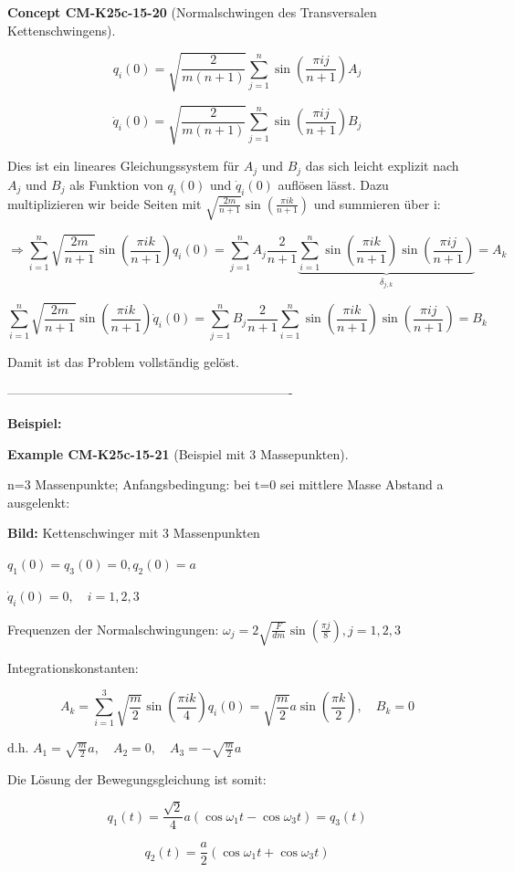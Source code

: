 \documentclass[10pt, letterpaper]{article}
\newcommand{\CustomHeading}[3]{%
  \par\medskip\noindent%
  \textbf{#1 #2} \textnormal{(#3)}.\enskip%
}
\newenvironment{EXA}[2]{\begin{unitbox}\CustomHeading{Example}{#1}{#2}}{\end{unitbox}}
\newenvironment{CONC}[2]{\begin{unitbox}\CustomHeading{Concept}{#1}{#2}}{\end{unitbox}}
\begin{document}
\begin{CONC}{CM-K25c-15-20}{Normalschwingen des Transversalen Kettenschwingens}
\[
q_i(0) = \sqrt{\frac{2}{m(n+1)}}\sum_{j=1}^n\sin\left(\frac{\pi ij}{n+1}\right)A_j
\]

\[
\dot{q}_i(0) = \sqrt{\frac{2}{m(n+1)}}\sum_{j=1}^n\sin\left(\frac{\pi ij}{n+1}\right)B_j
\]

Dies ist ein lineares Gleichungssystem für $A_j$ und $B_j$ das sich leicht explizit nach $A_j$ und $B_j$ als Funktion von
$q_i(0)$ und $\dot{q}_i(0)$ auflösen lässt. Dazu multiplizieren wir beide Seiten mit $\sqrt{\frac{2m}{n+1}}\sin\left(\frac{\pi ik}{n+1}\right)$ und summieren über i:

\[\Rightarrow \sum_{i=1}^n \sqrt{\frac{2m}{n+1}}\sin\left(\frac{\pi ik}{n+1}\right)q_i(0) = \sum_{j=1}^n A_j \frac{2}{n+1} \underbrace{\sum_{i=1}^n \sin\left(\frac{\pi ik}{n+1}\right)\sin\left(\frac{\pi ij}{n+1}\right)}_{\delta_{j,k}} = A_k\]

\[\sum_{i=1}^n \sqrt{\frac{2m}{n+1}}\sin\left(\frac{\pi ik}{n+1}\right)\dot{q}_i(0) = \sum_{j=1}^n B_j \frac{2}{n+1} \sum_{i=1}^n \sin\left(\frac{\pi ik}{n+1}\right)\sin\left(\frac{\pi ij}{n+1}\right) = B_k\]

Damit ist das Problem vollständig gelöst.
\end{CONC}






-------------------------------------------------------------------



\textbf{Beispiel:} 


\begin{EXA}{CM-K25c-15-21}{Beispiel mit 3 Massepunkten}
n=3 Massenpunkte; Anfangsbedingung: bei t=0 sei mittlere Masse Abstand a ausgelenkt:

\textbf{Bild:} Kettenschwinger mit 3 Massenpunkten

$q_1(0) = q_3(0) = 0, q_2(0) = a$

$\dot{q}_i(0) = 0, \quad i=1,2,3$

Frequenzen der Normalschwingungen: $\omega_j = 2\sqrt{\frac{F}{dm}}\sin\left(\frac{\pi j}{8}\right), j=1,2,3$

Integrationskonstanten:

\[A_k = \sum_{i=1}^3 \sqrt{\frac{m}{2}}\sin\left(\frac{\pi ik}{4}\right)q_i(0) = \sqrt{\frac{m}{2}}a\sin\left(\frac{\pi k}{2}\right), \quad B_k = 0\]

d.h. $A_1 = \sqrt{\frac{m}{2}}a, \quad A_2 = 0, \quad A_3 = -\sqrt{\frac{m}{2}}a$

Die Lösung der Bewegungsgleichung ist somit:

\[q_1(t) = \frac{\sqrt{2}}{4}a(\cos\omega_1t - \cos\omega_3t) = q_3(t)\]

\[q_2(t) = \frac{a}{2}(\cos\omega_1t + \cos\omega_3t)\]
\end{EXA}
\end{document}
